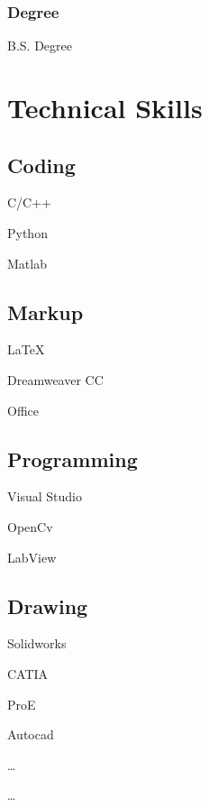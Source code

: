 \documentclass[a4paper,12pt,final]{memoir}
\newcommand{\Sep}{\vspace{1.5em}}
\newcommand{\SmallSep}{\vspace{0.5em}}
\begin{document}
\subsubsection{Degree}
B.S. Degree

\section{Technical Skills}
\subsection{Coding}
\begin{multicols}{3}
\begin{compactitem}[\color{RoyalBlue}$\circ$] 
	\item C/C++ 
	\item Python
	\item Matlab
\end{compactitem}
\end{multicols}
\subsection{Markup}
\begin{multicols}{3}
\begin{compactitem}[\color{RoyalBlue}$\circ$]
	\item {\LaTeX} 
	\item Dreamweaver CC 
	\item Office 
\end{compactitem}
\end{multicols}

\subsection{Programming}
\begin{multicols}{3}
\begin{compactitem}[\color{RoyalBlue}$\circ$]
	\item Visual Studio 
	\item OpenCv
	\item LabView 
\end{compactitem}
\end{multicols}

\subsection{Drawing}
\begin{multicols}{3}
\begin{compactitem}[\color{RoyalBlue}$\circ$]
	\item Solidworks 
	\item CATIA
	\item ProE
	\item Autocad
	\item \ldots
	\item \ldots
\end{compactitem}
\end{multicols}
\end{document}
